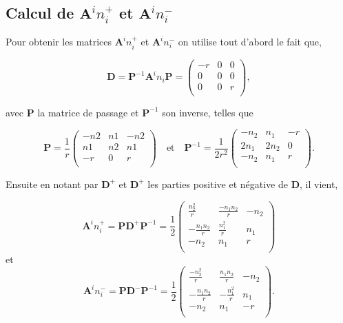 \documentclass[a4paper,oneside,10pt]{report}
\begin{document}
\subsection{Calcul de $\mathbf{A}^i n_i^+$ et $\mathbf{A}^i n_i^-$}

Pour obtenir les matrices $\mathbf{A}^i n_i^+$ et $\mathbf{A}^i n_i^-$ on utilise tout d'abord le fait que, 

\begin{equation}
\mathbf{D} =\mathbf{P}^{-1}\mathbf{A}^in_i\mathbf{P}=
\begin{pmatrix}
-r & 0 &0 \\
0& 0 & 0\\
0 & 0 & r\\
\end{pmatrix},
\end{equation}

avec $\mathbf{P}$ la matrice de passage et $\mathbf{P}^{-1}$ son inverse, telles que

\begin{equation}
\mathbf{P}=\frac{1}{r}
\begin{pmatrix}
-n2 & n1 &-n2\\
n1 & n2 & n1\\
-r & 0 & r\\
\end{pmatrix}
\quad \mbox{et} \quad
\mathbf{P}^{-1}=\frac{1}{2r^2}
\begin{pmatrix}
-n_2 & n_1 & -r\\
2n_1 & 2n_2 & 0\\
-n_2 & n_1 & r\\
\end{pmatrix}.
\end{equation}

Ensuite en notant par $\mathbf{D}^+$ et $\mathbf{D}^+$ les parties positive et négative de $\mathbf{D}$, il vient,

\begin{equation}
\mathbf{A}^in_i^+= \mathbf{P}\mathbf{D}^+\mathbf{P}^{-1} = \frac{1}{2}
\begin{pmatrix}
\frac{n_2^2}{r} & \frac{-n_1n_2}{r}  & -n_2 \\
-\frac{n_1n_2}{r}& \frac{n_1^2}{r} & n_1\\
-n_2& n_1 & r\\
\end{pmatrix}
\end{equation}
et
\begin{equation}
\mathbf{A}^in_i^-= \mathbf{P}\mathbf{D}^-\mathbf{P}^{-1} = \frac{1}{2}
\begin{pmatrix}
\frac{-n_2^2}{r} & \frac{n_1n_2}{r}  & -n_2 \\
-\frac{n_1n_2}{r}&  -\frac{n_1^2}{r} & n_1\\
-n_2& n_1 & -r\\
\end{pmatrix}.
\end{equation}
\end{document}
